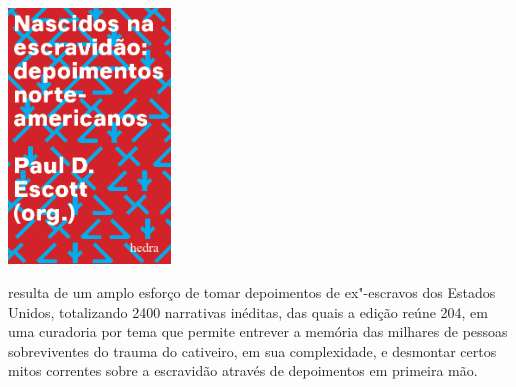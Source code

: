 \hspace{.5cm}

\begin{center}
\hspace*{-4.5cm}
\hspace*{4cm}\includegraphics[width=43mm]{./imgs/wpa.jpg}
\end{center}

\hspace*{-7cm}\hrulefill\hspace*{-7cm}

\medskip

 resulta de um amplo esforço de tomar depoimentos de ex"-escravos dos Estados Unidos, totalizando 2400 narrativas inéditas, das quais a edição reúne 204, em uma curadoria por tema que permite entrever a memória das milhares de pessoas sobreviventes do trauma do cativeiro, em sua complexidade, e desmontar certos mitos correntes sobre a escravidão através de depoimentos em primeira mão.


\vfill

\hspace*{-.4cm}\begin{minipage}[c]{1\linewidth}
\small{
{}}
\end{minipage}

